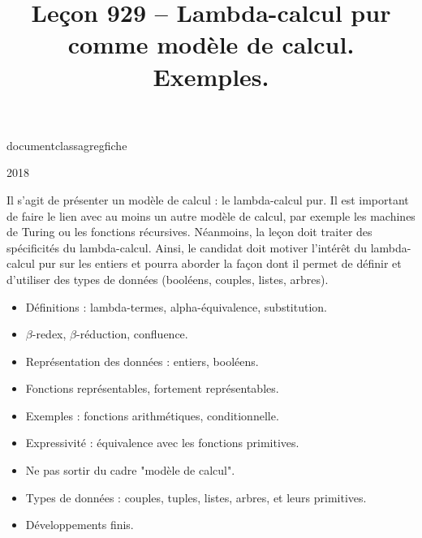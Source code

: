documentclass{agregfiche}

\title{Leçon 929 -- Lambda-calcul pur comme modèle de calcul. Exemples.}



\maketitle

\secrapports

\begin{rapport}{2018}

Il s'agit de présenter un modèle de calcul : le lambda-calcul pur.
Il est important de faire le lien avec au moins un autre modèle de calcul, par exemple les machines de Turing ou les fonctions récursives.
Néanmoins, la leçon doit traiter des spécificités du lambda-calcul.
Ainsi, le candidat doit motiver l'intérêt du lambda-calcul pur sur les entiers et pourra aborder la façon dont il permet de définir et d'utiliser des types de données (booléens, couples, listes, arbres).

\end{rapport}

\secindispensables

\begin{itemize}
    \item Définitions : lambda-termes, alpha-équivalence, substitution.
    \item $\beta$-redex, $\beta$-réduction, confluence.
    \item Représentation des données : entiers, booléens.
    \item Fonctions représentables, fortement représentables.
    \item Exemples : fonctions arithmétiques, conditionnelle.
    \item Expressivité : équivalence avec les fonctions primitives.
\end{itemize}

\secpieges

\begin{itemize}
    \item Ne pas sortir du cadre "modèle de calcul".
\end{itemize}

\secidees

\begin{itemize}
    \item Types de données : couples, tuples, listes, arbres, et leurs primitives.
    \item Développements finis.
\end{itemize}

